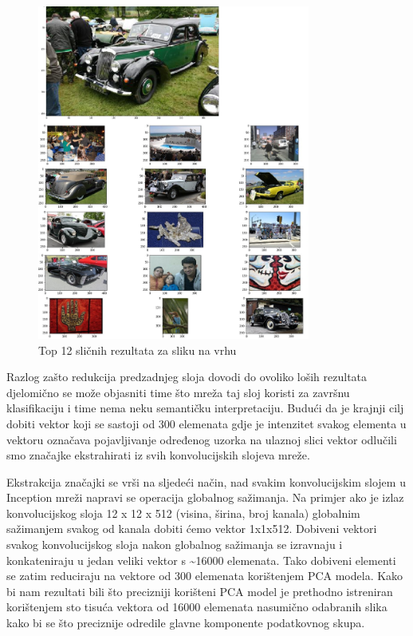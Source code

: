 \documentclass[times, utf8, proizvoljni, numeric]{fer}
\begin{document}
\begin{figure}[H]
	\begin{center}
		\captionsetup{justification=centering}
		\includegraphics[width=0.8\textwidth]{./imgs/inception_zadnji_sloj_auti_greska.png}
		\caption{Top 12 sličnih rezultata za sliku na vrhu}
		\label{fg:inception_zadnji_sloj_auti_greska}
	\end{center}
\end{figure}

Razlog zašto redukcija predzadnjeg sloja dovodi do ovoliko loših rezultata djelomično se može objasniti time što mreža taj sloj koristi za završnu klasifikaciju i time nema neku semantičku interpretaciju. Budući da je krajnji cilj dobiti vektor koji se sastoji od 300 elemenata gdje je intenzitet svakog elementa u vektoru označava pojavljivanje određenog uzorka na ulaznoj slici vektor odlučili smo značajke ekstrahirati iz svih konvolucijskih slojeva mreže. 

Ekstrakcija značajki se vrši na sljedeći način, nad svakim konvolucijskim slojem u Inception mreži napravi se operacija globalnog sažimanja. Na primjer ako je izlaz konvolucijskog sloja 12 x 12 x 512 (visina, širina, broj kanala) globalnim sažimanjem svakog od kanala dobiti ćemo vektor 1x1x512. Dobiveni vektori svakog konvolucijskog sloja nakon globalnog sažimanja se izravnaju i konkateniraju u jedan veliki vektor s  \textasciitilde16000 elemenata.  Tako dobiveni elementi se zatim reduciraju na vektore od 300 elemenata korištenjem PCA modela. Kako bi nam rezultati bili što precizniji korišteni PCA model je prethodno istreniran korištenjem sto tisuća vektora od 16000 elemenata nasumično odabranih slika kako bi se što preciznije odredile glavne komponente podatkovnog skupa.
\end{document}
